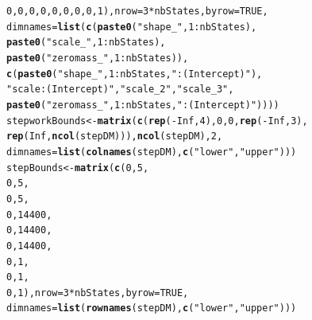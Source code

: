 \documentclass[12pt]{article}\usepackage[]{graphicx}\usepackage[]{xcolor}
\makeatletter
\newcommand{\hlnum}[1]{\textcolor[rgb]{0.686,0.059,0.569}{#1}}%
\newcommand{\hlsng}[1]{\textcolor[rgb]{0.192,0.494,0.8}{#1}}%
\newcommand{\hlopt}[1]{\textcolor[rgb]{0,0,0}{#1}}%
\newcommand{\hldef}[1]{\textcolor[rgb]{0.345,0.345,0.345}{#1}}%
\newcommand{\hlkwb}[1]{\textcolor[rgb]{0.69,0.353,0.396}{#1}}%
\newcommand{\hlkwc}[1]{\textcolor[rgb]{0.333,0.667,0.333}{#1}}%
\newcommand{\hlkwd}[1]{\textcolor[rgb]{0.737,0.353,0.396}{\textbf{#1}}}%
\newenvironment{kframe}{%
 \def\at@end@of@kframe{}%
 \ifinner\ifhmode%
  \def\at@end@of@kframe{\end{minipage}}%
  \begin{minipage}{\columnwidth}%
 \fi\fi%
 \def\FrameCommand##1{\hskip\@totalleftmargin \hskip-\fboxsep
 \colorbox{shadecolor}{##1}\hskip-\fboxsep
     \hskip-\linewidth \hskip-\@totalleftmargin \hskip\columnwidth}%
 \MakeFramed {\advance\hsize-\width
   \@totalleftmargin\z@ \linewidth\hsize
   \@setminipage}}%
 {\par\unskip\endMakeFramed%
 \at@end@of@kframe}
\newenvironment{knitrout}{}{} %
\makeatother
\begin{document}
\begin{knitrout}
\begin{kframe}
\begin{alltt}
                 \hlnum{0}\hldef{,}\hlnum{0}\hldef{,}\hlnum{0}\hldef{,}\hlnum{0}\hldef{,}\hlnum{0}\hldef{,}\hlnum{0}\hldef{,}\hlnum{0}\hldef{,}\hlnum{0}\hldef{,}\hlnum{1}\hldef{),}\hlkwc{nrow}\hldef{=}\hlnum{3}\hlopt{*}\hldef{nbStates,}\hlkwc{byrow}\hldef{=}\hlnum{TRUE}\hldef{,}
        \hlkwc{dimnames}\hldef{=}\hlkwd{list}\hldef{(}\hlkwd{c}\hldef{(}\hlkwd{paste0}\hldef{(}\hlsng{"shape_"}\hldef{,}\hlnum{1}\hlopt{:}\hldef{nbStates),}
                        \hlkwd{paste0}\hldef{(}\hlsng{"scale_"}\hldef{,}\hlnum{1}\hlopt{:}\hldef{nbStates),}
                        \hlkwd{paste0}\hldef{(}\hlsng{"zeromass_"}\hldef{,}\hlnum{1}\hlopt{:}\hldef{nbStates)),}
                      \hlkwd{c}\hldef{(}\hlkwd{paste0}\hldef{(}\hlsng{"shape_"}\hldef{,}\hlnum{1}\hlopt{:}\hldef{nbStates,}\hlsng{":(Intercept)"}\hldef{),}
                        \hlsng{"scale:(Intercept)"}\hldef{,}\hlsng{"scale_2"}\hldef{,}\hlsng{"scale_3"}\hldef{,}
                        \hlkwd{paste0}\hldef{(}\hlsng{"zeromass_"}\hldef{,}\hlnum{1}\hlopt{:}\hldef{nbStates,}\hlsng{":(Intercept)"}\hldef{))))}
\hldef{stepworkBounds}\hlkwb{<-}\hlkwd{matrix}\hldef{(}\hlkwd{c}\hldef{(}\hlkwd{rep}\hldef{(}\hlopt{-}\hlnum{Inf}\hldef{,}\hlnum{4}\hldef{),}\hlnum{0}\hldef{,}\hlnum{0}\hldef{,}\hlkwd{rep}\hldef{(}\hlopt{-}\hlnum{Inf}\hldef{,}\hlnum{3}\hldef{),}
                   \hlkwd{rep}\hldef{(}\hlnum{Inf}\hldef{,}\hlkwd{ncol}\hldef{(stepDM))),}\hlkwd{ncol}\hldef{(stepDM),}\hlnum{2}\hldef{,}
                   \hlkwc{dimnames}\hldef{=}\hlkwd{list}\hldef{(}\hlkwd{colnames}\hldef{(stepDM),}\hlkwd{c}\hldef{(}\hlsng{"lower"}\hldef{,}\hlsng{"upper"}\hldef{)))}
\hldef{stepBounds}\hlkwb{<-}\hlkwd{matrix}\hldef{(}\hlkwd{c}\hldef{(}\hlnum{0}\hldef{,}\hlnum{5}\hldef{,}
                     \hlnum{0}\hldef{,}\hlnum{5}\hldef{,}
                     \hlnum{0}\hldef{,}\hlnum{5}\hldef{,}
                     \hlnum{0}\hldef{,}\hlnum{14400}\hldef{,}
                     \hlnum{0}\hldef{,}\hlnum{14400}\hldef{,}
                     \hlnum{0}\hldef{,}\hlnum{14400}\hldef{,}
                     \hlnum{0}\hldef{,}\hlnum{1}\hldef{,}
                     \hlnum{0}\hldef{,}\hlnum{1}\hldef{,}
                     \hlnum{0}\hldef{,}\hlnum{1}\hldef{),}\hlkwc{nrow}\hldef{=}\hlnum{3}\hlopt{*}\hldef{nbStates,}\hlkwc{byrow}\hldef{=}\hlnum{TRUE}\hldef{,}
                    \hlkwc{dimnames}\hldef{=}\hlkwd{list}\hldef{(}\hlkwd{rownames}\hldef{(stepDM),}\hlkwd{c}\hldef{(}\hlsng{"lower"}\hldef{,}\hlsng{"upper"}\hldef{)))}
\end{alltt}
\end{kframe}
\end{knitrout}
\end{document}
